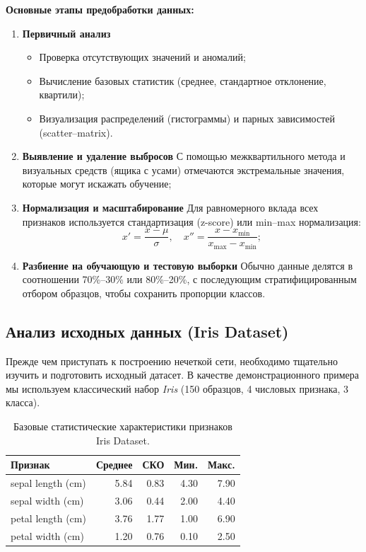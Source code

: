 \medskip
\noindent\textbf{Основные этапы предобработки данных:}
\begin{enumerate}
  \item \textbf{Первичный анализ}  
    \begin{itemize}
      \item Проверка отсутствующих значений и аномалий;
      \item Вычисление базовых статистик (среднее, стандартное отклонение, квартили);
      \item Визуализация распределений (гистограммы) и парных зависимостей (scatter–matrix).
    \end{itemize}
  \item \textbf{Выявление и удаление выбросов}  
    С помощью межквартильного метода и визуальных средств (ящика с усами) отмечаются экстремальные значения, которые могут искажать обучение;
  \item \textbf{Нормализация и масштабирование}  
    Для равномерного вклада всех признаков используется стандартизация (z-score) или min–max нормализация:
    \[
      x' = \frac{x - \mu}{\sigma},\quad
      x'' = \frac{x - x_{\min}}{x_{\max}-x_{\min}};
    \]
  \item \textbf{Разбиение на обучающую и тестовую выборки}  
    Обычно данные делятся в соотношении 70\%–30\% или 80\%–20\%, с последующим стратифицированным отбором образцов, чтобы сохранить пропорции классов.
\end{enumerate}

\subsection{Анализ исходных данных (Iris Dataset)}


Прежде чем приступать к построению нечеткой сети, необходимо тщательно изучить и подготовить исходный датасет. В качестве демонстрационного примера мы используем классический набор \emph{Iris} (150 образцов, 4 числовых признака, 3 класса).

\begin{table}[H]
  \centering
  \caption{Базовые статистические характеристики признаков Iris Dataset.}
  \begin{tabular}{lrrrr}
    \toprule
    Признак & Среднее & СКО & Мин. & Макс. \\
    \midrule
    sepal length (cm) & 5.84 & 0.83 & 4.30 & 7.90 \\
    sepal width  (cm) & 3.06 & 0.44 & 2.00 & 4.40 \\
    petal length (cm) & 3.76 & 1.77 & 1.00 & 6.90 \\
    petal width  (cm) & 1.20 & 0.76 & 0.10 & 2.50 \\
    \bottomrule
  \end{tabular}
  \label{tab:iris_stats}
\end{table}

